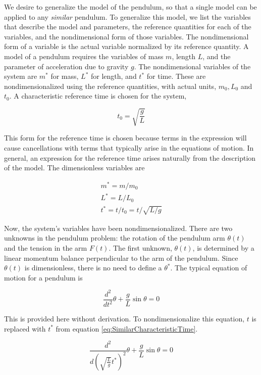 We desire to generalize the model of the pendulum, so that a single model can be applied to any \textit{similar} pendulum. To generalize this model, we list the variables that describe the model and parameters, the reference quantities for each of the variables, and the nondimensional form of those variables. The nondimensional form of a variable is the actual variable normalized by its reference quantity. A model of a pendulum requires the variables of mass $m$,  length $L$, and the parameter of acceleration due to gravity $g$. The nondimensional variables of the system are $m^{*}$ for mass, $L^{*}$ for length, and $t^{*}$ for time. These are nondimensionalized using the reference quantities, with actual units, $m_{0}, L_{0}$ and $t_{0}$. A characteristic reference time is chosen for the system,

\begin{equation}
t_{0} = \sqrt{\frac{g}{L}}
\label{eq:SimilarCharacteristicTime}
\end{equation}

This form for the reference time is chosen because terms in the expression will cause cancellations with terms that typically arise in the equations of motion. In general, an expression for the reference time arises naturally from the description of the model. The dimensionless variables are

\begin{align}
m^{*} = m/m_{0} \\
L^{*} = L/L_{0} \\
t^{*} = t/t_{0} = t/\sqrt{L/g}
\end{align}

Now, the system's variables have been nondimensionalized. There are two unknowns in the pendulum problem: the rotation of the pendulum arm $\theta(t)$ and the tension in the arm $F(t)$. The first unknown, $\theta(t)$, is determined by a linear momentum balance perpendicular to the arm of the pendulum. Since $\theta(t)$ is dimensionless, there is no need to define a $\theta^{*}$.  The typical equation of motion for a pendulum is

\begin{equation}
\frac{d^{2}}{dt^{2}}\theta + \frac{g}{L} \sin{\theta} = 0 
\end{equation}

This is provided here without derivation. To nondimensionalize this equation, $t$ is replaced with $t^{*}$ from equation \ref{eq:SimilarCharacteristicTime}. 

\begin{equation}
\frac{d^{2}}{d\left(\sqrt{\frac{L}{g}}t^{*}\right)^{2}}\theta + \frac{g}{L} \sin{\theta} = 0  
\end{equation}


